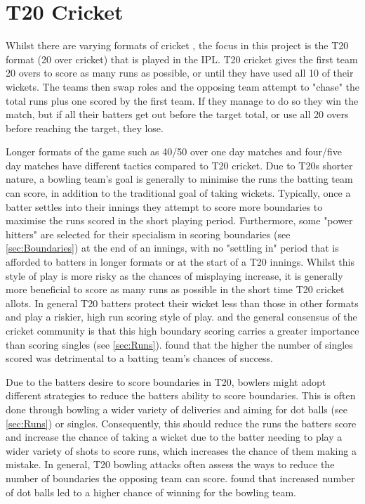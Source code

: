 \documentclass[12pt,a4paper]{report}
\theoremstyle{definition}
\begin{document}
\section{T20 Cricket} \label{sec:T20Cricket}

Whilst there are varying formats of cricket \footnotemark{}, the focus in this project is the T20 format (20 over cricket) that is played in the IPL.
T20 cricket gives the first team 20 overs to score as many runs as possible, or until they have used all 10 of their wickets.
The teams then swap roles and the opposing team attempt to "chase" the total runs plus one scored by the first team. 
If they manage to do so they win the match, but if all their batters get out before the target total, or use all 20 overs before reaching the target, they lose.


Longer formats of the game such as 40/50 over one day matches and four/five day matches have different tactics compared to T20 cricket.
Due to T20s shorter nature, a bowling team's goal is generally to minimise the runs the batting team can score, in addition to the traditional goal of taking wickets.
Typically, once a batter settles into their innings they attempt to score more boundaries to maximise the runs scored in the short playing period.
Furthermore, some "power hitters" are selected for their specialism in scoring boundaries (see \ref{sec:Boundaries}) at the end of an innings, with no "settling in" period that is afforded to batters in longer formats or at the start of a T20 innings.
Whilst this style of play is more risky as the chances of misplaying increase, it is generally more beneficial to score as many runs as possible in the short time T20 cricket allots.
In general T20 batters protect their wicket less than those in other formats and play a riskier, high run scoring style of play.
\citet{Irvine2017} and the general consensus of the cricket community is that this high boundary scoring carries a greater importance than scoring singles (see \ref{sec:Runs}). 
\citet{Irvine2017} found that the higher the number of singles scored was detrimental to a batting team's chances of success.

Due to the batters desire to score boundaries in T20, bowlers might adopt different strategies to reduce the batters ability to score boundaries. 
This is often done through bowling a wider variety of deliveries and aiming for dot balls (see \ref{sec:Runs}) or singles.
Consequently, this should reduce the runs the batters score and increase the chance of taking a wicket due to the batter needing to play a wider variety of shots to score runs, which increases the chance of them making a mistake.
In general, T20 bowling attacks often assess the ways to reduce the number of boundaries the opposing team can score.
\citet{Irvine2017} found that increased number of dot balls led to a higher chance of winning for the bowling team. 
\end{document}
